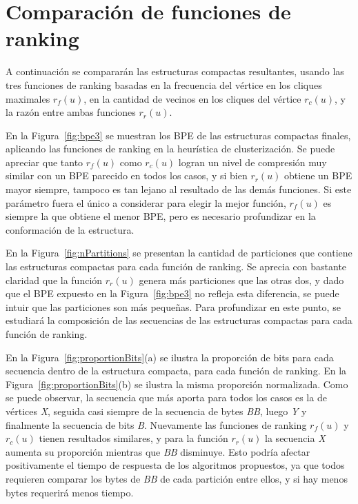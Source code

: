 









\section{Comparación de funciones de ranking}

A continuación se compararán las estructuras compactas resultantes, usando las tres funciones de ranking basadas en la frecuencia del vértice en los cliques maximales $r_{f}(u)$, en la cantidad de vecinos en los cliques del vértice $r_{c}(u)$, y la razón entre ambas funciones $r_{r}(u)$. 

En la Figura~\ref{fig:bpe3} se muestran los BPE de las estructuras compactas finales, aplicando las funciones de ranking en la heurística de clusterización. Se puede apreciar que tanto $r_{f}(u)$ como $r_{c}(u)$ logran un nivel de compresión muy similar con un BPE parecido en todos los casos, y si bien $r_{r}(u)$ obtiene un BPE mayor siempre, tampoco es tan lejano al resultado de las demás funciones. Si este parámetro fuera el único a considerar para elegir la mejor función, $r_{f}(u)$ es siempre la que obtiene el menor BPE, pero es necesario profundizar en la conformación de la estructura.

%


En la Figura~\ref{fig:nPartitions} se presentan la cantidad de particiones que contiene las estructuras compactas para cada función de ranking. Se aprecia con bastante claridad que la función $r_{r}(u)$ genera más particiones que las otras dos, y dado que el BPE expuesto en la Figura~\ref{fig:bpe3} no refleja esta diferencia, se puede intuir que las particiones son más pequeñas. Para profundizar en este punto, se estudiará la composición de las secuencias de las estructuras compactas para cada función de ranking.



En la Figura~\ref{fig:proportionBits}(a) se ilustra la proporción de bits para cada secuencia dentro de la estructura compacta, para cada función de ranking. En la Figura~\ref{fig:proportionBits}(b) se ilustra la misma proporción normalizada. Como se puede observar, la secuencia que más aporta para todos los casos es la de vértices \textit{X}, seguida casi siempre de la secuencia de bytes \textit{BB}, luego \textit{Y} y finalmente la secuencia de bits \textit{B}. Nuevamente las funciones de ranking $r_{f}(u)$ y $r_{c}(u)$ tienen resultados similares, y para la función $r_{r}(u)$ la secuencia \textit{X} aumenta su proporción mientras que \textit{BB} disminuye. Esto podría afectar positivamente el tiempo de respuesta de los algoritmos propuestos, ya que todos requieren comparar los bytes de \textit{BB} de cada partición entre ellos, y si hay menos bytes requerirá menos tiempo.


